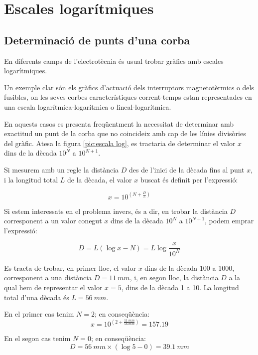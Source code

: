 \section{Escales logarítmiques}\label{sec:escales-log} 

\subsection{Determinació de punts d'una corba}

En diferents camps de l'electrotècnia és usual trobar gràfics amb escales
logarítmiques.

Un exemple clar són els gràfics d'actuació dels interruptors magnetotèrmics o dels
fusibles, on les seves corbes característiques corrent-temps estan representades en
una escala logarítmica-logarítmica o lineal-logarítmica.

En aquests casos es presenta freqüentment la necessitat de determinar amb exactitud un
punt de la corba que no coincideix amb cap de les línies divisòries del gràfic. Atesa
la figura \vref{pic:escala log}, es tractaria de determinar el valor $x$ dins de la dècada
$10^N$ a $10^{N+1}$.

\begin{center}
    
    \label{pic:escala log}
\end{center}

Si mesurem amb un regle la distància $D$ des de l'inici de la dècada fins al punt $x$, i
la longitud total $L$ de la dècada, el valor $x$ buscat és definit per l'expressió:

\begin{equation}
    x = 10^{\left(N+\frac{D}{L}\right)}
\end{equation}

Si estem interessats en el problema invers, és a dir, en  trobar la distància $D$
corresponent a un valor conegut $x$ dins de la dècada $10^N$ a $10^{N+1}$, podem emprar
l'expressió:

\begin{equation}
    D = L(\log x - N) = L \log\frac{x}{10^N}
\end{equation}

	
\begin{exemple}[\ValorsEscalaLog{}]
	\addcontentsxms{\ValorsEscalaLog}
    Es tracta de trobar, en primer lloc, el valor $x$ dins de la dècada 100 a 1000, corresponent a una
    distància $D=\qty{11}{mm}$, i, en segon lloc, la distància $D$ a la qual hem de representar el valor $x=5$, dins de la
    dècada 1 a 10. La longitud total d'una dècada és $L=\qty{56}{mm}$.

    En el primer cas tenim $N=2$; en conseqüència:
    \[
        x = 10^{\left(2+\frac{\qty{11}{mm}}{\qty{56}{mm}}\right)}= \num{157,19}
    \]

    En el segon cas tenim $N=0$; en conseqüència:
    \[
        D = \qty{56}{mm} \times (\log 5 - 0)  = \qty{39,1}{mm}
    \]

\end{exemple}

